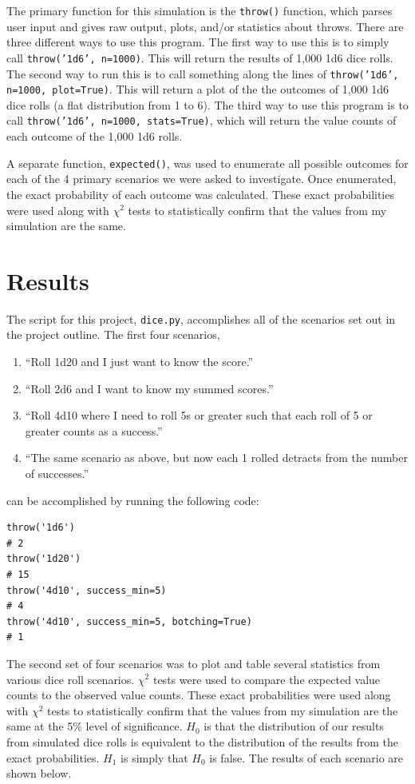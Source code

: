 \documentclass[twocolumn,letterpaper]{article}  %
\begin{document}
The primary function for this simulation is the \texttt{throw()} function, which parses user input and gives raw output, plots, and/or statistics about throws. There are three different ways to use this program. The first way to use this is to simply call \texttt{throw('1d6', n=1000)}. This will return the results of 1,000 1d6 dice rolls. The second way to run this is to call something along the lines of \texttt{throw('1d6', n=1000, plot=True)}. This will return a plot of the the outcomes of 1,000 1d6 dice rolls (a flat distribution from 1 to 6). The third way to use this program is to call \texttt{throw('1d6', n=1000, stats=True)}, which will return the value counts of each outcome of the 1,000 1d6 rolls.

A separate function, \texttt{expected()}, was used to enumerate all possible outcomes for each of the 4 primary scenarios we were asked to investigate. Once enumerated, the exact probability of each outcome was calculated. These exact probabilities were used along with $\chi^2$ tests to statistically confirm that the values from my simulation are the same.

\section{Results}
The script for this project, \texttt{dice.py}, accomplishes all of the scenarios set out in the project outline. The first four scenarios,
\begin{enumerate}
\itemsep-.25em
\item ``Roll 1d20 and I just want to know the score.''
\item ``Roll 2d6 and I want to know my summed scores.''
\item ``Roll 4d10 where I need to roll 5s or greater such that each roll of 5 or greater counts as a success.''
\item ``The same scenario as above, but now each 1 rolled detracts from the number of successes.''
\end{enumerate}
\noindent can be accomplished by running the following code:
\begin{lstlisting}
throw('1d6')
# 2
throw('1d20')
# 15
throw('4d10', success_min=5)
# 4
throw('4d10', success_min=5, botching=True)
# 1
\end{lstlisting}

The second set of four scenarios was to plot and table several statistics from various dice roll scenarios. $\chi^2$ tests were used to compare the expected value counts to the observed value counts. These exact probabilities were used along with $\chi^2$ tests to statistically confirm that the values from my simulation are the same at the 5\% level of significance. $H_0$ is that the distribution of our results from simulated dice rolls is equivalent to the distribution of the results from the exact probabilities. $H_1$ is simply that $H_0$ is false. The results of each scenario are shown below.
\end{document}
